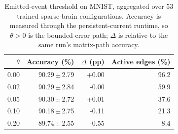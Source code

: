 \begin{table}[t]
\centering
\small
\caption{Emitted-event threshold on MNIST, aggregated over 53 trained sparse-brain configurations. Accuracy is measured through the persistent-current runtime, so $\theta>0$ is the bounded-error path; $\Delta$ is relative to the same run's matrix-path accuracy.}
\label{tab:theta}
\begin{tabular}{rrrr}
\toprule
$\theta$ & Accuracy (\%) & $\Delta$ (pp) & Active edges (\%) \\
\midrule
0.00 & 90.29\,$\pm$\,2.79 & +0.00 & 96.2 \\
0.02 & 90.29\,$\pm$\,2.84 & -0.00 & 59.9 \\
0.05 & 90.30\,$\pm$\,2.72 & +0.01 & 37.6 \\
0.10 & 90.18\,$\pm$\,2.75 & -0.11 & 21.3 \\
0.20 & 89.74\,$\pm$\,2.55 & -0.55 & 8.4 \\
\bottomrule
\end{tabular}
\end{table}
